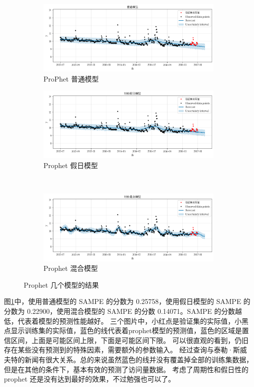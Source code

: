 \begin{figure}[htbp]
	\centering
	\begin{subfigure}{.5\textwidth}
		\centering
		\includegraphics[width=\linewidth]{figures/prophet_normal.png}
		\caption{ProPhet 普通模型}
	\end{subfigure}%
	\begin{subfigure}{.5\textwidth}
		\centering
		\includegraphics[width=\linewidth]{figures/prophet_holidays.png}
		\caption{Prophet 假日模型}
	\end{subfigure}\\
	\begin{subfigure}{\textwidth}
		\centering
		\includegraphics[width=\linewidth]{figures/prophet_mix.png}
		\caption{Prophet 混合模型}
	\end{subfigure}
	\caption{Prophet 几个模型的结果}
	\label{compare_model}
\end{figure}

图\ref{compare_model}中，使用普通模型的 SAMPE 的分数为 0.25758，使用假日模型的 SAMPE 的分数为 0.22900，使用混合模型的 SAMPE 的分数 0.14071。SAMPE 的分数越低，代表着模型的预测性能越好。
三个图片中，小红点是验证集的实际值，小黑点显示训练集的实际值，蓝色的线代表着prophet模型的预测值，蓝色的区域是置信区间，上面是可能区间上限，下面是可能区间下限。
可以很直观的看到，仍旧存在某些没有预测到的特殊因素，需要额外的参数输入。
经过查询与泰勒·斯威夫特的新闻有很大关系。总的来说虽然蓝色的线并没有覆盖掉全部的训练集数据，但是在其他的条件下，基本有效的预测了访问量数据。
考虑了周期性和假日性的 prophet 还是没有达到最好的效果，不过勉强也可以了。

